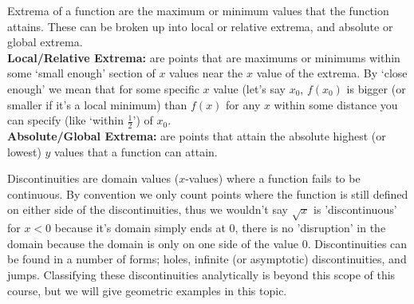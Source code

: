 \documentclass{ximera}
\begin{document}
\begin{definition}[Extrema]
    Extrema of a function are the maximum or minimum values that the function attains. These can be broken up into local or relative extrema, and absolute or global extrema.\\
    \textbf{Local/Relative Extrema:} are points that are maximums or minimums within some `small enough' section of $x$ values near the $x$ value of the extrema. By `close enough' we mean that for some specific $x$ value (let's say $x_0$, $f(x_0)$ is bigger (or smaller if it's a local minimum) than $f(x)$ for any $x$ within some distance you can specify (like `within $\frac{1}{2}$')  of $x_0$.\\
    \textbf{Absolute/Global Extrema:} are points that attain the absolute highest (or lowest) $y$ values that a function can attain.
\end{definition}

\begin{definition}[Discontinuities]
    Discontinuities are domain values ($x$-values) where a function fails to be continuous. By convention we only count points where the function is still defined on either side of the discontinuities, thus we wouldn't say $\sqrt{x}$ is 'discontinuous' for $x < 0$ because it's domain simply ends at 0, there is no 'disruption' in the domain because the domain is only on one side of the value 0. Discontinuities can be found in a number of forms; holes, infinite (or asymptotic) discontinuities, and jumps. Classifying these discontinuities analytically is beyond this scope of this course, but we will give geometric examples in this topic.
\end{definition}
\end{document}

